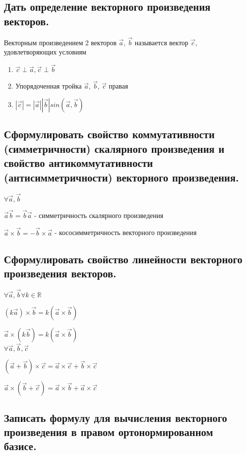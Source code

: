 \documentclass[a4paper, 10pt]{article}
\renewcommand{\a}{\vec{a}}
\renewcommand{\b}{\vec{b}}
\renewcommand{\c}{\vec{c}}
\begin{document}
\subsection{Дать определение векторного произведения векторов.}

Векторным произведением 2 векторов $\a$, $\b$ называется вектор $\c$, удовлетворяющих условиям
\begin{enumerate}
    \item $\c \perp \a, \c \perp \b$
    \item Упорядоченная тройка $\a$, $\b$, $\c$ правая
    \item $|\c| = |\a||\b|sin(\a, \b)$
\end{enumerate}

\subsection{Сформулировать свойство коммутативности (симметричности) скалярного произведения 
и свойство антикоммутативности (антисимметричности) векторного произведения.}

\begin{center}
$\forall \a, \b$

$\a\b = \b\a$ - симметричность скалярного произведения

$\a \times \b = - \b \times \a$ - кососимметричность векторного произведения
\end{center}

\subsection{Сформулировать свойство линейности векторного произведения векторов.}

\begin{center}
    $\forall \a, \b \forall k \in \mathbb{R}$
    
    $(k\a) \times \b = k(\a \times \b)$
    
    $\a \times (k\b) = k(\a \times \b)$\\
    
    $\forall \a, \b, \c$
    
    $(\a + \b) \times \c = \a \times \c + \b \times \c$
    
    $\a \times (\b + \c) = \a \times \b + \a \times \c$
\end{center}

\subsection{Записать формулу для вычисления векторного произведения в правом ортонормированном базисе.}
\end{document}
